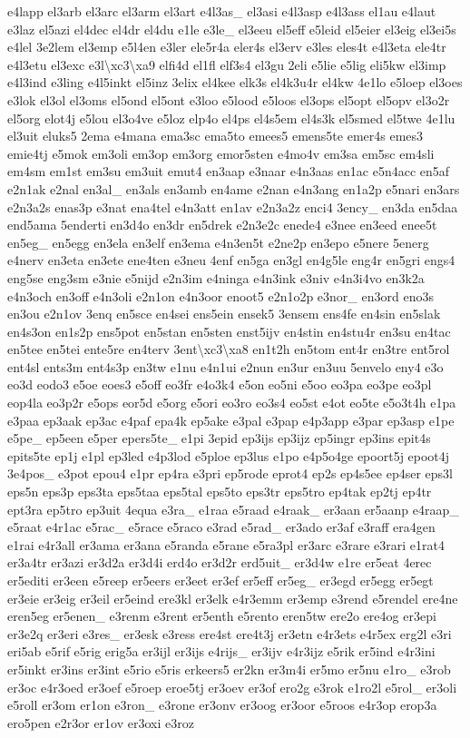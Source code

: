 {e4lapp el3arb el3arc el3arm el3art e4l3as\-\_\- el3asi e4l3asp e4l3ass el1au e4laut e3laz el5azi el4dec el4dr el4du e1le e3le\-\_\- el3eeu el5eff e5leid el5eier el3eig el3ei5s e4lel 3e2lem el3emp e5l4en e3ler ele5r4a eler4s el3erv e3les eles4t e4l3eta ele4tr e4l3etu el3exc e3l\textbackslash{}xc3\textbackslash{}xa9 elfi4d el1fl elf3s4 el3gu 2eli e5lie e5lig eli5kw el3imp e4l3ind e3ling e4l5inkt el5inz 3elix el4kee elk3s el4k3u4r el4kw 4e1lo e5loep el3oes e3lok el3ol el3oms el5ond el5ont e3loo e5lood e5loos el3ops el5opt el5opv el3o2r el5org elot4j e5lou el3o4ve e5loz elp4o el4ps el4s5em el4s3k el5smed el5twe 4e1lu el3uit eluks5 2ema e4mana ema3sc ema5to emees5 emens5te emer4s emes3 emie4tj e5mok em3oli em3op em3org emor5sten e4mo4v em3sa em5sc em4sli em4sm em1st em3su em3uit emut4 en3aap e3naar e4n3aas en1ac e5n4acc en5af e2n1ak e2nal en3al\-\_\- en3als en3amb en4ame e2nan e4n3ang en1a2p e5nari en3ars e2n3a2s enas3p e3nat ena4tel e4n3att en1av e2n3a2z enci4 3ency\-\_\- en3da en5daa end5ama 5enderti en3d4o en3dr en5drek e2n3e2c enede4 e3nee en3eed enee5t en5eg\-\_\- en5egg en3ela en3elf en3ema e4n3en5t e2ne2p en3epo e5nere 5energ e4nerv en3eta en3ete ene4ten e3neu 4enf en5ga en3gl en4g5le eng4r en5gri engs4 eng5se eng3sm e3nie e5nijd e2n3im e4ninga e4n3ink e3niv e4n3i4vo en3k2a e4n3och en3off e4n3oli e2n1on e4n3oor enoot5 e2n1o2p e3nor\-\_\- en3ord eno3s en3ou e2n1ov 3enq en5sce en4sei ens5ein ensek5 3ensem ens4fe en4sin en5slak en4s3on en1s2p ens5pot en5stan en5sten enst5ijv en4stin en4stu4r en3su en4tac en5tee en5tei ente5re en4terv 3ent\textbackslash{}xc3\textbackslash{}xa8 en1t2h en5tom ent4r en3tre ent5rol ent4sl ents3m ent4s3p en3tw e1nu e4n1ui e2nun en3ur en3uu 5envelo eny4 e3o eo3d eodo3 e5oe eoes3 e5off eo3fr e4o3k4 e5on eo5ni e5oo eo3pa eo3pe eo3pl eop4la eo3p2r e5ops eor5d e5org e5ori eo3ro eo3s4 eo5st e4ot eo5te e5o3t4h e1pa e3paa ep3aak ep3ac e4paf epa4k ep5ake e3pal e3pap e4p3app e3par ep3asp e1pe e5pe\-\_\- ep5een e5per epers5te\-\_\- e1pi 3epid ep3ijs ep3ijz ep5ingr ep3ins epit4s epits5te ep1j e1pl ep3led e4p3lod e5ploe ep3lus e1po e4p5o4ge epoort5j epoot4j 3e4pos\-\_\- e3pot epou4 e1pr ep4ra e3pri ep5rode eprot4 ep2s ep4s5ee ep4ser eps3l eps5n eps3p eps3ta eps5taa eps5tal eps5to eps3tr eps5tro ep4tak ep2tj ep4tr ept3ra ep5tro ep3uit 4equa e3ra\-\_\- e1raa e5raad e4raak\-\_\- er3aan er5aanp e4raap\-\_\- e5raat e4r1ac e5rac\-\_\- e5race e5raco e3rad e5rad\-\_\- er3ado er3af e3raff era4gen e1rai e4r3all er3ama er3ana e5randa e5rane e5ra3pl er3arc e3rare e3rari e1rat4 er3a4tr er3azi er3d2a er3d4i erd4o er3d2r erd5uit\-\_\- er3d4w e1re er5eat 4erec er5editi er3een e5reep er5eers er3eet er3ef er5eff er5eg\-\_\- er3egd er5egg er5egt er3eie er3eig er3eil er5eind ere3kl er3elk e4r3emm er3emp e3rend e5rendel ere4ne eren5eg er5enen\-\_\- e3renm e3rent er5enth e5rento eren5tw ere2o ere4og er3epi er3e2q er3eri e3res\-\_\- er3esk e3ress ere4st ere4t3j er3etn e4r3ets e4r5ex erg2l e3ri eri5ab e5rif e5rig erig5a er3ijl er3ijs e4rijs\-\_\- er3ijv e4r3ijz e5rik er5ind e4r3ini er5inkt er3ins er3int e5rio e5ris erkeers5 er2kn er3m4i er5mo er5nu e1ro\-\_\- e3rob er3oc e4r3oed er3oef e5roep eroe5tj er3oev er3of ero2g e3rok e1ro2l e5rol\-\_\- er3oli e5roll er3om er1on e3ron\-\_\- e3rone er3onv er3oog er3oor e5roos e4r3op erop3a ero5pen e2r3or er1ov er3oxi e3roz }
